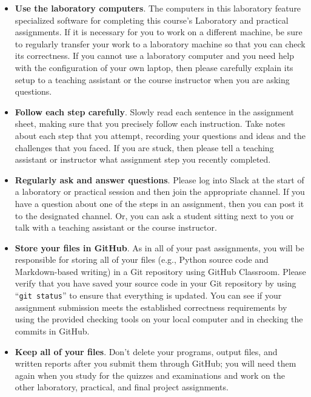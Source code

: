 \documentclass[11pt]{article}
\newcommand{\command}[1]{``\lstinline{#1}''}
\begin{document}
\begin{itemize}
  \setlength{\itemsep}{0pt}

\item {\bf Use the laboratory computers}. The computers in this laboratory
  feature specialized software for completing this course's Laboratory and
  practical assignments. If it is necessary for you to work on a different
  machine, be sure to regularly transfer your work to a laboratory machine so
  that you can check its correctness. If you cannot use a laboratory computer
  and you need help with the configuration of your own laptop, then please
  carefully explain its setup to a teaching assistant or the course instructor
  when you are asking questions.

\item {\bf Follow each step carefully}. Slowly read each sentence in the
  assignment sheet, making sure that you precisely follow each instruction.
  Take notes about each step that you attempt, recording your questions and
  ideas and the challenges that you faced. If you are stuck, then please tell a
  teaching assistant or instructor what assignment step you recently completed.

\item {\bf Regularly ask and answer questions}. Please log into Slack at the
  start of a laboratory or practical session and then join the appropriate
  channel. If you have a question about one of the steps in an assignment, then
  you can post it to the designated channel. Or, you can ask a student sitting
  next to you or talk with a teaching assistant or the course instructor.

\item {\bf Store your files in GitHub}. As in all of your past assignments, you
  will be responsible for storing all of your files (e.g., Python source code and
  Markdown-based writing) in a Git repository using GitHub Classroom. Please
  verify that you have saved your source code in your Git repository by using
  \command{git status} to ensure that everything is updated. You can see if
  your assignment submission meets the established correctness requirements by
  using the provided checking tools on your local computer and in checking the
  commits in GitHub.

\item {\bf Keep all of your files}. Don't delete your programs, output files,
  and written reports after you submit them through GitHub; you will need them
  again when you study for the quizzes and examinations and work on the other
  laboratory, practical, and final project assignments.


\end{itemize}
\end{document}
